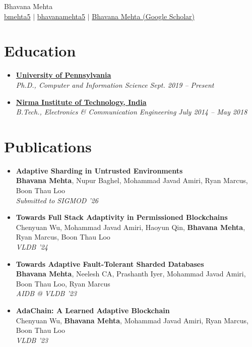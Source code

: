 \documentclass[a4paper,11pt]{article}
\newcommand{\resumeEduSubheading}[5]{\vspace{-2pt}\item\href{#2}{\textbf{#1}}\\\textit{\small#3} \hfill \textit{\small #4} \\\text{\small #5}}
\newcommand{\resumePubSubheading}[4]{\vspace{-2pt}\item\textbf{#1} {\small #2} \\\small#3 \\ \textit{\small #4}}
\newcommand{\resumeSubHeadingListStart}{\begin{itemize}[leftmargin=0.15in, label={}]}
\newcommand{\resumeSubHeadingListEnd}{\end{itemize}}
\begin{document}
{\Huge Bhavana Mehta}\\
\vspace{2pt}
\href{https://www.linkedin.com/in/bmehta5/}{\faLinkedin\thinspace bmehta5} $|$
\href{https://github.com/bhavanamehta5}{\faGithub\thinspace bhavanamehta5} $|$
\href{https://scholar.google.com/citations?user=IY2DisAAAAAJ&hl=en}{\faGraduationCap\thinspace Bhavana Mehta (Google Scholar)}
\section{Education}
\vspace{-4pt}
\resumeSubHeadingListStart
\resumeEduSubheading{University of Pennsylvania}{}{Ph.D., Computer and Information Science}{Sept. 2019 -- Present}{Advisor: Dr. Boon Thau Loo}
\resumeEduSubheading{Nirma Institute of Technology, India}{}{B.Tech., Electronics \& Communication Engineering}{July 2014 -- May 2018}{}
\resumeSubHeadingListEnd

\section{Publications}
\vspace{-4 pt}
\resumeSubHeadingListStart
\resumePubSubheading{Adaptive Sharding in Untrusted Environments}{}{\textbf{Bhavana Mehta}, Nupur Baghel, Mohammad Javad Amiri, Ryan Marcus, Boon Thau Loo}{Submitted to SIGMOD '26}
\resumePubSubheading{Towards Full Stack Adaptivity in Permissioned Blockchains}{\href{https://dl.acm.org/doi/abs/10.14778/3641204.3641216}{}}{Chenyuan Wu, Mohammad Javad Amiri, Haoyun Qin, \textbf{Bhavana Mehta}, Ryan Marcus, Boon Thau Loo}{VLDB '24}
\resumePubSubheading{Towards Adaptive Fault-Tolerant Sharded Databases}{\href{https://ceur-ws.org/Vol-3462/AIDB6.pdf}{}}{\textbf{Bhavana Mehta}, Neelesh CA, Prashanth Iyer, Mohammad Javad Amiri, Boon Thau Loo, Ryan Marcus}{AIDB @ VLDB '23}
\resumePubSubheading{AdaChain: A Learned Adaptive Blockchain}{\href{https://dl.acm.org/doi/abs/10.14778/3594512.3594531}{}}{Chenyuan Wu, \textbf{Bhavana Mehta}, Mohammad Javad Amiri, Ryan Marcus, Boon Thau Loo}{VLDB '23}
\resumeSubHeadingListEnd
\end{document}
